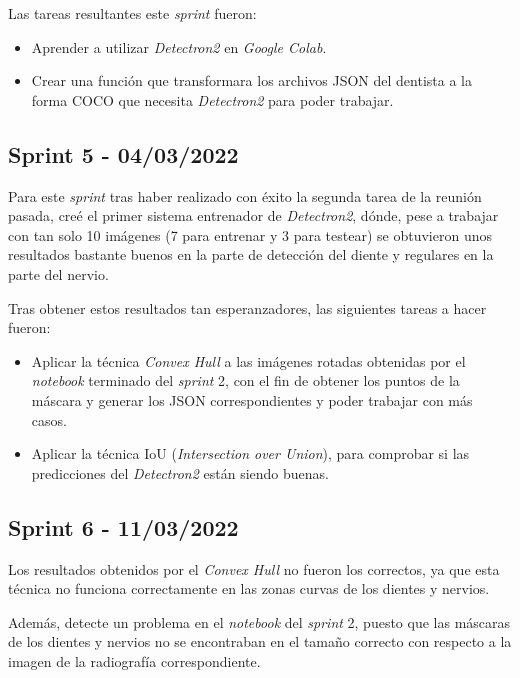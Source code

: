 Las tareas resultantes este \emph{sprint} fueron:
\begin{itemize}
    \item Aprender a utilizar \emph{Detectron2} en \emph{Google Colab}.
    \item Crear una función que transformara los archivos JSON del dentista a la forma COCO que necesita \emph{Detectron2} para poder trabajar.
\end{itemize}

\subsection{Sprint 5 - 04/03/2022}
Para este \emph{sprint} tras haber realizado con éxito la segunda tarea de la reunión pasada, creé el primer sistema entrenador de \emph{Detectron2}, dónde, pese a trabajar con tan solo 10 imágenes (7 para entrenar y 3 para testear) se obtuvieron unos resultados bastante buenos en la parte de detección del diente y regulares en la parte del nervio.

Tras obtener estos resultados tan esperanzadores, las siguientes tareas a hacer fueron:
\begin{itemize}
    \item Aplicar la técnica \emph{Convex Hull} a las imágenes rotadas obtenidas por el \emph{notebook} terminado del  \emph{sprint} 2, con el fin de obtener los puntos de la máscara y generar los JSON correspondientes y poder trabajar con más casos.
    \item Aplicar la técnica IoU (\emph{Intersection over Union}), para comprobar si las predicciones del \emph{Detectron2} están siendo buenas.
\end{itemize}

\subsection{Sprint 6 - 11/03/2022}
Los resultados obtenidos por el \emph{Convex Hull} no fueron los correctos, ya que esta técnica no funciona correctamente en las zonas curvas de los dientes y nervios.

Además, detecte un problema en el \emph{notebook} del \emph{sprint} 2, puesto que las máscaras de los dientes y nervios no se encontraban en el tamaño correcto con respecto a la imagen de la radiografía correspondiente.

